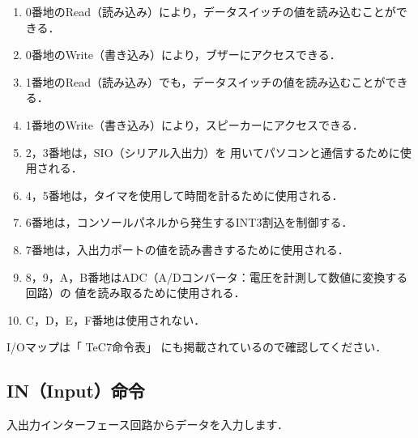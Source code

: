 \begin{enumerate}
\item 0番地のRead（読み込み）により，データスイッチの値を読み込むことができる．
\item 0番地のWrite（書き込み）により，ブザーにアクセスできる．
\item 1番地のRead（読み込み）でも，データスイッチの値を読み込むことができる．
\item 1番地のWrite（書き込み）により，スピーカーにアクセスできる．
\item 2，3番地は，SIO（シリアル入出力）を
  用いてパソコンと通信するために使用される．
\item 4，5番地は，タイマを使用して時間を計るために使用される．
\item 6番地は，コンソールパネルから発生するINT3割込を制御する．
\item 7番地は，入出力ポートの値を読み書きするために使用される．
\item 8，9，A，B番地はADC（A/Dコンバータ：電圧を計測して数値に変換する回路）の
  値を読み取るために使用される．
\item C，D，E，F番地は使用されない．
\end{enumerate}

I/Oマップは「 TeC7命令表」
にも掲載されているので確認してください．

\subsection{IN（Input）命令}
入出力インターフェース回路からデータを入力します．

